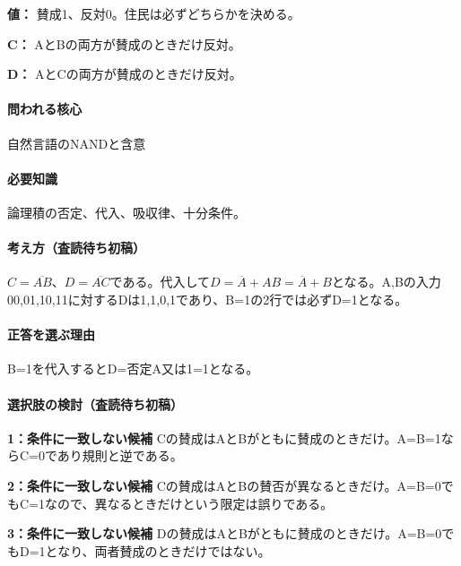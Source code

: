 \noindent\textbf{値：} 賛成1、反対0。住民は必ずどちらかを決める。\par

\noindent\textbf{C：} AとBの両方が賛成のときだけ反対。\par

\noindent\textbf{D：} AとCの両方が賛成のときだけ反対。\par

\paragraph{問われる核心} 自然言語のNANDと含意

\paragraph{必要知識} 論理積の否定、代入、吸収律、十分条件。

\paragraph{考え方（査読待ち初稿）} \(C=\overline{AB}\)、\(D=\overline{AC}\)である。代入して\(D=\overline A+AB=\overline A+B\)となる。A,Bの入力00,01,10,11に対するDは1,1,0,1であり、B=\allowbreak{}1の2行では必ずD=\allowbreak{}1となる。

\paragraph{正答を選ぶ理由} B=\allowbreak{}1を代入するとD=否定A又は1=\allowbreak{}1となる。

\paragraph{選択肢の検討（査読待ち初稿）}\mbox{}\par

\noindent\textbf{1：条件に一致しない候補} Cの賛成はAとBがともに賛成のときだけ。A=\allowbreak{}B=\allowbreak{}1ならC=\allowbreak{}0であり規則と逆である。\par

\noindent\textbf{2：条件に一致しない候補} Cの賛成はAとBの賛否が異なるときだけ。A=\allowbreak{}B=\allowbreak{}0でもC=\allowbreak{}1なので、異なるときだけという限定は誤りである。\par

\noindent\textbf{3：条件に一致しない候補} Dの賛成はAとBがともに賛成のときだけ。A=\allowbreak{}B=\allowbreak{}0でもD=\allowbreak{}1となり、両者賛成のときだけではない。\par

